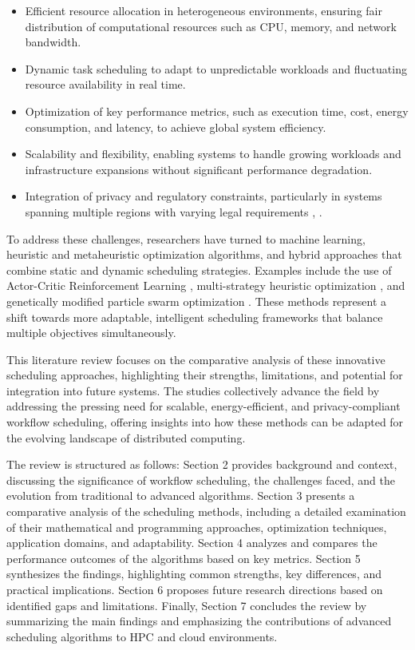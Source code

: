 \documentclass[a4paper, final]{article}
\begin{document}
\begin{itemize}
\item Efficient resource allocation in heterogeneous environments, ensuring fair distribution of computational resources 
such as CPU, memory, and network bandwidth.
\item Dynamic task scheduling to adapt to unpredictable workloads and fluctuating resource availability in real time.
\item Optimization of key performance metrics, such as execution time, cost, energy consumption, and latency, to achieve 
global system efficiency.
\item Scalability and flexibility, enabling systems to handle growing workloads and infrastructure expansions without 
significant performance degradation.
\item Integration of privacy and regulatory constraints, particularly in systems spanning multiple regions with varying 
legal requirements \cite{bib:7_ppps}, \cite{bib:10}.
\end{itemize}

To address these challenges, researchers have turned to machine learning, heuristic and metaheuristic optimization 
algorithms, and hybrid approaches that combine static and dynamic scheduling strategies. Examples include the use of 
Actor-Critic Reinforcement Learning \cite{bib:1_acrl}, multi-strategy heuristic optimization \cite{bib:3_sandcat}, and 
genetically modified particle swarm optimization \cite{bib:10}. These methods represent a shift towards more adaptable, 
intelligent scheduling frameworks that balance multiple objectives simultaneously.

This literature review focuses on the comparative analysis of these innovative scheduling approaches, highlighting 
their strengths, limitations, and potential for integration into future systems. The studies collectively advance the 
field by addressing the pressing need for scalable, energy-efficient, and privacy-compliant workflow scheduling, 
offering insights into how these methods can be adapted for the evolving landscape of distributed computing.

The review is structured as follows: Section 2 provides background and context, discussing the 
significance of workflow scheduling, the challenges faced, and the evolution from traditional to 
advanced algorithms. Section 3 presents a comparative analysis of the scheduling methods, including a 
detailed examination of their mathematical and programming approaches, optimization techniques, 
application domains, and adaptability. Section 4 analyzes and compares the performance outcomes of the 
algorithms based on key metrics. Section 5 synthesizes the findings, highlighting common strengths, key differences, and practical 
implications. Section 6 proposes future research directions based on identified gaps and limitations. Finally, Section 7 
concludes the review by summarizing the main findings and emphasizing the contributions of advanced scheduling algorithms 
to HPC and cloud environments.
\end{document}
